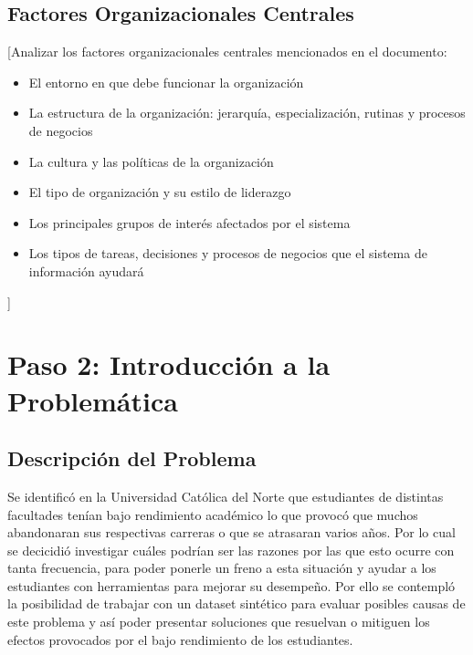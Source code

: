 \documentclass[12pt,letterpaper]{report}
\begin{document}
\subsection{Factores Organizacionales Centrales}
[Analizar los factores organizacionales centrales mencionados en el documento:
\begin{itemize}
    \item El entorno en que debe funcionar la organización
    \item La estructura de la organización: jerarquía, especialización, rutinas y procesos de negocios
    \item La cultura y las políticas de la organización
    \item El tipo de organización y su estilo de liderazgo
    \item Los principales grupos de interés afectados por el sistema
    \item Los tipos de tareas, decisiones y procesos de negocios que el sistema de información ayudará
\end{itemize}]

\section{Paso 2: Introducción a la Problemática}

\subsection{Descripción del Problema}
Se identificó en la Universidad Católica del Norte que estudiantes de distintas facultades tenían bajo rendimiento académico lo que provocó que muchos abandonaran sus respectivas carreras o que se atrasaran varios años. Por lo cual se decicidió investigar cuáles podrían ser las razones por las que esto ocurre con tanta frecuencia, para poder ponerle un freno a esta situación y ayudar a los estudiantes con herramientas para mejorar su desempeño. Por ello se contempló la posibilidad de trabajar con un dataset sintético para evaluar posibles causas de este problema y así poder presentar soluciones que resuelvan o mitiguen los efectos provocados por el bajo rendimiento de los estudiantes.
\end{document}
